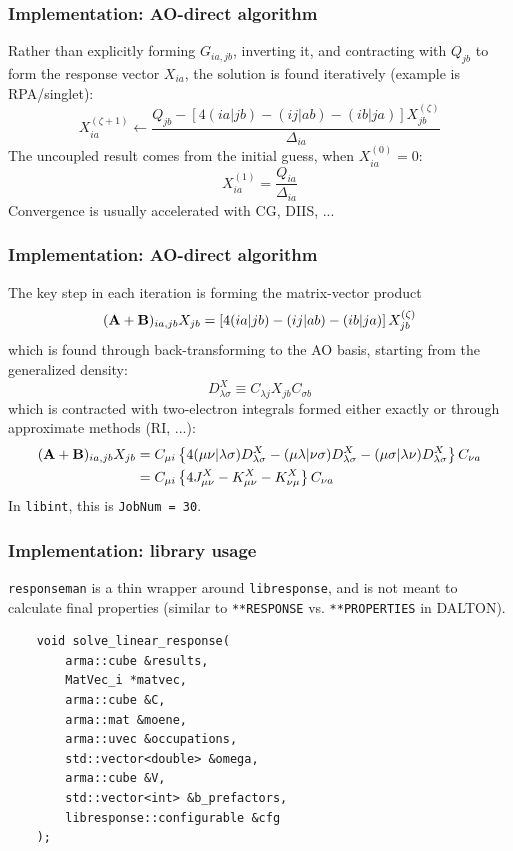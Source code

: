 \documentclass[xcolor=usenames,dvipsnames,svgnames]{beamer}
\begin{document}
\begin{frame}
  \frametitle{Implementation: AO-direct algorithm}
  Rather than explicitly forming \(G_{ia,jb}\), inverting it, and contracting with \(Q_{jb}\) to form the response vector \(X_{ia}\), the solution is found iteratively (example is RPA/singlet):
  \begin{equation*}
    X_{ia}^{(\zeta+1)} \leftarrow \frac{Q_{jb} - \left[4(ia|jb) - (ij|ab) - (ib|ja)\right] X_{jb}^{(\zeta)}}{\Delta_{ia}}
  \end{equation*}
  The uncoupled result comes from the initial guess, when \(X_{ia}^{(0)} = 0\):
  \begin{equation*}
    X_{ia}^{(1)} = \frac{Q_{ia}}{\Delta_{ia}}
  \end{equation*}
  Convergence is usually accelerated with CG, DIIS, ...
\end{frame}

\begin{frame}
  \frametitle{Implementation: AO-direct algorithm}
  \scriptsize
  The key step in each iteration is forming the matrix-vector product
  \begin{equation*}
    (\boldsymbol{\mathbf{A}}+\boldsymbol{\mathbf{B}})_{ia,jb}X_{jb} = \left[4(ia|jb) - (ij|ab) - (ib|ja)\right] X_{jb}^{(\zeta)}
  \end{equation*}
  which is found through back-transforming to the AO basis, starting from the generalized density:
  \begin{equation*}
    D_{\lambda\sigma}^{X} \equiv C_{\lambda j} X_{jb} C_{\sigma b}
  \end{equation*}
  which is contracted with two-electron integrals formed either exactly or through approximate methods (RI, ...):
  \begin{align*}
    (\boldsymbol{\mathbf{A}}+\boldsymbol{\mathbf{B}})_{ia,jb}X_{jb} &= C_{\mu i} \left\{ 4(\mu\nu|\lambda\sigma)D_{\lambda\sigma}^{X} - (\mu\lambda|\nu\sigma)D_{\lambda\sigma}^{X} - (\mu\sigma|\lambda\nu)D_{\lambda\sigma}^{X} \right\} C_{\nu a} \\
    &= C_{\mu i} \left\{ 4J_{\mu\nu}^{X} - K_{\mu\nu}^{X} - K_{\nu\mu}^{X} \right\} C_{\nu a}
  \end{align*}
  In \texttt{libint}, this is \texttt{JobNum = 30}.
\end{frame}

\begin{frame}[fragile]
  \frametitle{Implementation: library usage}
  \texttt{responseman} is a thin wrapper around \texttt{libresponse}, and is not meant to calculate final properties (similar to \texttt{**RESPONSE} vs. \texttt{**PROPERTIES} in DALTON). \\
  \begin{verbatim}
    void solve_linear_response(
        arma::cube &results,
        MatVec_i *matvec,
        arma::cube &C,
        arma::mat &moene,
        arma::uvec &occupations,
        std::vector<double> &omega,
        arma::cube &V,
        std::vector<int> &b_prefactors,
        libresponse::configurable &cfg
    );
  \end{verbatim}
\end{frame}
\end{document}
